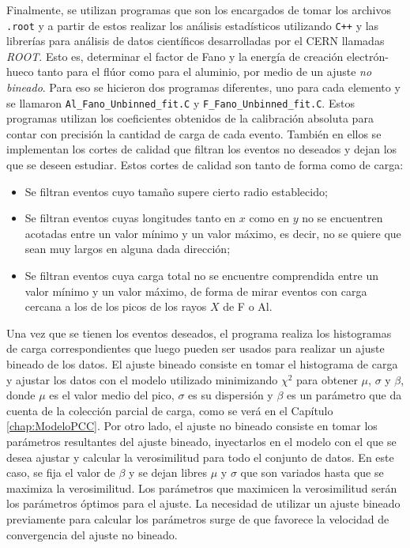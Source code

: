 Finalmente, se utilizan programas que son los encargados de tomar los archivos \verb|.root| y a partir de estos realizar los análisis estadísticos utilizando \verb|C++| y las librerías para análisis de datos científicos desarrolladas por el CERN llamadas \textit{ROOT}. Esto es, determinar el factor de Fano y la energía de creación electrón-hueco tanto para el flúor como para el aluminio, por medio de un ajuste \textit{no bineado}. Para eso se hicieron dos programas diferentes, uno para cada elemento y se llamaron \verb|Al_Fano_Unbinned_fit.C| y \verb|F_Fano_Unbinned_fit.C|. Estos programas utilizan los coeficientes obtenidos de la calibración absoluta para contar con precisión la cantidad de carga de cada evento. También en ellos se implementan los cortes de calidad que filtran los eventos no deseados y dejan los que se deseen estudiar. Estos cortes de calidad son tanto de forma como de carga: 
\begin{itemize}
    \item Se filtran eventos cuyo tamaño supere cierto radio establecido;
    \item Se filtran eventos cuyas longitudes tanto en $x$ como en $y$ no se encuentren acotadas entre un valor mínimo y un valor máximo, es decir, no se quiere que sean muy largos en alguna dada dirección;
    \item Se filtran eventos cuya carga total no se encuentre comprendida entre un valor mínimo y un valor máximo, de forma de mirar eventos con carga cercana a los de los picos de los rayos $X$ de F o Al.
\end{itemize}
Una vez que se tienen los eventos deseados, el programa realiza los histogramas de carga correspondientes que luego pueden ser usados para realizar un ajuste bineado de los datos. El ajuste bineado consiste en tomar el histograma de carga y ajustar los datos con el modelo utilizado minimizando $\chi^{2}$ para obtener $\mu$, $\sigma$ y $\beta$, donde $\mu$ es el valor medio del pico, $\sigma$ es su dispersión y $\beta$ es un parámetro que da cuenta de la colección parcial de carga, como se verá en el Capítulo \ref{chap:ModeloPCC}. Por otro lado, el ajuste no bineado consiste en tomar los parámetros resultantes del ajuste bineado, inyectarlos en el modelo con el que se desea ajustar y calcular la verosimilitud para todo el conjunto de datos. En este caso, se fija el valor de $\beta$ y se dejan libres $\mu$ y $\sigma$ que son variados hasta que se maximiza la verosimilitud. Los parámetros que maximicen la verosimilitud serán los parámetros óptimos para el ajuste. La necesidad de utilizar un ajuste bineado previamente para calcular los parámetros surge de que favorece la velocidad de convergencia del ajuste no bineado.


